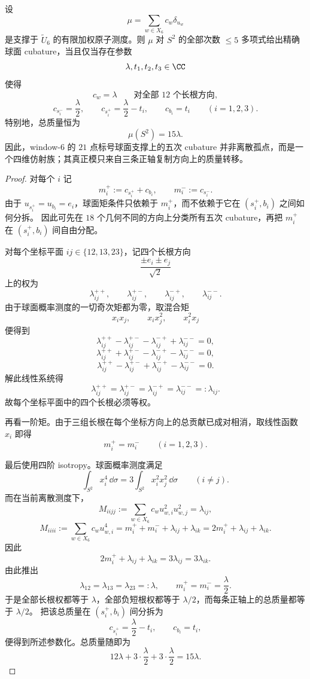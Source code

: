 \begin{theorem}\label{thm:window6-labeled-spherical-degree5-cubature-family}
设
\[
\mu=\sum_{w\in X_6}c_w\delta_{u_w}
\]
是支撑于 \(\widetilde U_6\) 的有限加权原子测度。则 \(\mu\) 对 \(S^2\) 的全部次数 \(\le 5\) 多项式给出精确球面 cubature，当且仅当存在参数
\[
\lambda,t_1,t_2,t_3\in \CC
\]
使得
\[
c_w=\lambda
\qquad
\text{对全部 \(12\) 个长根方向},
\]
\[
c_{s_i^-}=\frac{\lambda}{2},
\qquad
c_{s_i^+}=\frac{\lambda}{2}-t_i,
\qquad
c_{b_i}=t_i
\qquad (i=1,2,3).
\]
特别地，总质量恒为
\[
\mu(S^2)=15\lambda.
\]
因此，window-\(6\) 的 \(21\) 点标号球面支撑上的五次 cubature 并非离散孤点，而是一个四维仿射族；其真正模只来自三条正轴复制方向上的质量转移。
\end{theorem}
\begin{proof}
对每个 \(i\) 记
\[
m_i^+:=c_{s_i^+}+c_{b_i},
\qquad
m_i^-:=c_{s_i^-}.
\]
由于 \(u_{s_i^+}=u_{b_i}=e_i\)，球面矩条件只依赖于 \(m_i^+\)，而不依赖于它在 \((s_i^+,b_i)\) 之间如何分拆。
因此可先在 \(18\) 个几何不同的方向上分类所有五次 cubature，再把 \(m_i^+\) 在 \((s_i^+,b_i)\) 间自由分配。

对每个坐标平面 \(ij\in\{12,13,23\}\)，记四个长根方向
\[
\frac{\pm e_i\pm e_j}{\sqrt2}
\]
上的权为
\[
\lambda_{ij}^{++},\qquad
\lambda_{ij}^{+-},\qquad
\lambda_{ij}^{-+},\qquad
\lambda_{ij}^{--}.
\]
由于球面概率测度的一切奇次矩都为零，取混合矩
\[
x_i x_j,\qquad x_i x_j^2,\qquad x_i^2 x_j
\]
便得到
\[
\lambda_{ij}^{++}-\lambda_{ij}^{+-}-\lambda_{ij}^{-+}+\lambda_{ij}^{--}=0,
\]
\[
\lambda_{ij}^{++}+\lambda_{ij}^{+-}-\lambda_{ij}^{-+}-\lambda_{ij}^{--}=0,
\]
\[
\lambda_{ij}^{++}-\lambda_{ij}^{+-}+\lambda_{ij}^{-+}-\lambda_{ij}^{--}=0.
\]
解此线性系统得
\[
\lambda_{ij}^{++}=\lambda_{ij}^{+-}=\lambda_{ij}^{-+}=\lambda_{ij}^{--}=:\lambda_{ij}.
\]
故每个坐标平面中的四个长根必须等权。

再看一阶矩。由于三组长根在每个坐标方向上的总贡献已成对相消，取线性函数 \(x_i\) 即得
\[
m_i^+=m_i^-
\qquad (i=1,2,3).
\]

最后使用四阶 isotropy。球面概率测度满足
\[
\int_{S^2}x_i^4\,\dd\sigma=3\int_{S^2}x_i^2x_j^2\,\dd\sigma
\qquad(i\ne j).
\]
而在当前离散测度下，
\[
M_{iijj}:=\sum_{w\in X_6}c_w u_{w,i}^2u_{w,j}^2=\lambda_{ij},
\]
\[
M_{iiii}:=\sum_{w\in X_6}c_w u_{w,i}^4
=m_i^++m_i^-+\lambda_{ij}+\lambda_{ik}
=2m_i^++\lambda_{ij}+\lambda_{ik}.
\]
因此
\[
2m_i^+ + \lambda_{ij}+\lambda_{ik}=3\lambda_{ij}=3\lambda_{ik}.
\]
由此推出
\[
\lambda_{12}=\lambda_{13}=\lambda_{23}=:\lambda,
\qquad
m_i^+=m_i^-=\frac{\lambda}{2}.
\]
于是全部长根权都等于 \(\lambda\)，全部负短根权都等于 \(\lambda/2\)，而每条正轴上的总质量都等于 \(\lambda/2\)。
把该总质量在 \((s_i^+,b_i)\) 间分拆为
\[
c_{s_i^+}=\frac{\lambda}{2}-t_i,
\qquad
c_{b_i}=t_i,
\]
便得到所述参数化。总质量随即为
\[
12\lambda+3\cdot\frac{\lambda}{2}+3\cdot\frac{\lambda}{2}=15\lambda.
\]


\end{proof}
